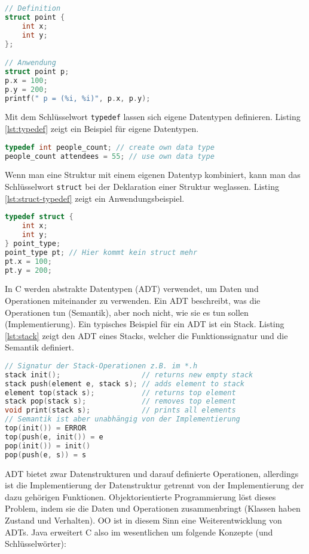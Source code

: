 \begin{lstlisting}[language=C, caption=Strukturen, label=lst:struct]
// Definition
struct point {
	int x;
	int y;
};

// Anwendung
struct point p;
p.x = 100;
p.y = 200;
printf(" p = (%i, %i)", p.x, p.y);
\end{lstlisting}

Mit dem Schlüsselwort \verb|typedef| lassen sich eigene Datentypen definieren. Listing \ref{lst:typedef} zeigt ein Beispiel für eigene Datentypen.

\begin{lstlisting}[language=C, caption=Eigene Typen, label=lst:typedef]
typedef int people_count; // create own data type
people_count attendees = 55; // use own data type
\end{lstlisting}

Wenn man eine Struktur mit einem eigenen Datentyp kombiniert, kann man das Schlüsselwort \verb|struct| bei der Deklaration einer Struktur weglassen. Listing \ref{lst:struct-typedef} zeigt ein Anwendungsbeispiel.

\begin{lstlisting}[language=C, caption=Struktur als eigener Datentypen, label=lst:struct-typedef]
typedef struct {
	int x;
	int y;
} point_type;
point_type pt; // Hier kommt kein struct mehr
pt.x = 100;
pt.y = 200;
\end{lstlisting}

In C werden abstrakte Datentypen (ADT) verwendet, um Daten und Operationen miteinander zu verwenden. Ein ADT beschreibt, was die Operationen tun (Semantik), aber noch nicht, wie sie es tun sollen (Implementierung). Ein typisches Beispiel für ein ADT ist ein Stack. Listing \ref{lst:stack} zeigt den ADT eines Stacks, welcher die Funktionssignatur und die Semantik definiert.

\begin{lstlisting}[language=C, caption=ADT Stack, label=lst:stack]
// Signatur der Stack-Operationen z.B. im *.h
stack init(); 					// returns new empty stack
stack push(element e, stack s); // adds element to stack
element top(stack s); 			// returns top element
stack pop(stack s); 			// removes top element
void print(stack s); 			// prints all elements
// Semantik ist aber unabhängig von der Implementierung
top(init()) = ERROR
top(push(e, init()) = e
pop(init()) = init()
pop(push(e, s)) = s
\end{lstlisting}

ADT bietet zwar Datenstrukturen und darauf definierte Operationen, allerdings ist die Implementierung der Datenstruktur getrennt von der Implementierung der dazu gehörigen Funktionen. Objektorientierte Programmierung löst dieses Problem, indem sie die Daten und Operationen zusammenbringt (Klassen haben Zustand und Verhalten). OO ist in diesem Sinn eine Weiterentwicklung von ADTs. Java erweitert C also im wesentlichen um folgende
Konzepte (und Schlüsselwörter):

